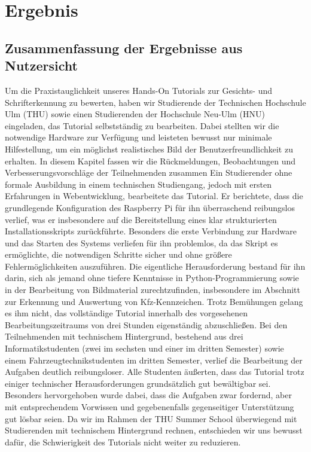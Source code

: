 \section{Ergebnis}
\subsection{Zusammenfassung der Ergebnisse aus Nutzersicht}
Um die Praxistauglichkeit unseres Hands-On Tutorials zur Gesichts- und Schrifterkennung zu bewerten, haben wir Studierende der Technischen Hochschule Ulm (THU) sowie einen Studierenden der Hochschule Neu-Ulm (HNU) eingeladen, das Tutorial selbstständig zu bearbeiten. Dabei stellten wir die notwendige Hardware zur Verfügung und leisteten bewusst nur minimale Hilfestellung, um ein möglichst realistisches Bild der Benutzerfreundlichkeit zu erhalten.
 In diesem Kapitel fassen wir die Rückmeldungen, Beobachtungen und Verbesserungsvorschläge der Teilnehmenden zusammen
Ein Studierender ohne formale Ausbildung in einem technischen Studiengang, jedoch mit ersten Erfahrungen in Webentwicklung, bearbeitete das Tutorial.
Er berichtete, dass die grundlegende Konfiguration des Raspberry Pi für ihn überraschend reibungslos verlief, was er insbesondere auf die Bereitstellung eines klar strukturierten Installationsskripts zurückführte. Besonders die erste Verbindung zur Hardware und das Starten des Systems verliefen für ihn problemlos, da das Skript es ermöglichte, die notwendigen Schritte sicher und ohne größere Fehlermöglichkeiten auszuführen. Die eigentliche Herausforderung bestand für ihn darin, sich als jemand ohne tiefere Kenntnisse in Python-Programmierung sowie in der Bearbeitung von Bildmaterial zurechtzufinden, insbesondere im Abschnitt zur Erkennung und Auswertung von Kfz-Kennzeichen.
Trotz Bemühungen gelang es ihm nicht, das vollständige Tutorial innerhalb des vorgesehenen Bearbeitungszeitraums von drei Stunden eigenständig abzuschließen.
Bei den Teilnehmenden mit technischem Hintergrund, bestehend aus drei Informatikstudenten (zwei im sechsten und einer im dritten Semester) sowie einem Fahrzeugtechnikstudenten im dritten Semester, verlief die Bearbeitung der Aufgaben deutlich reibungsloser.
 Alle Studenten äußerten, dass das Tutorial trotz einiger technischer Herausforderungen grundsätzlich gut bewältigbar sei. Besonders hervorgehoben wurde dabei, dass die Aufgaben zwar fordernd, aber mit entsprechendem Vorwissen und gegebenenfalls gegenseitiger Unterstützung gut lösbar seien.
Da wir im Rahmen der THU Summer School überwiegend mit Studierenden mit technischem Hintergrund rechnen, entschieden wir uns bewusst dafür, die Schwierigkeit des Tutorials nicht weiter zu reduzieren.

